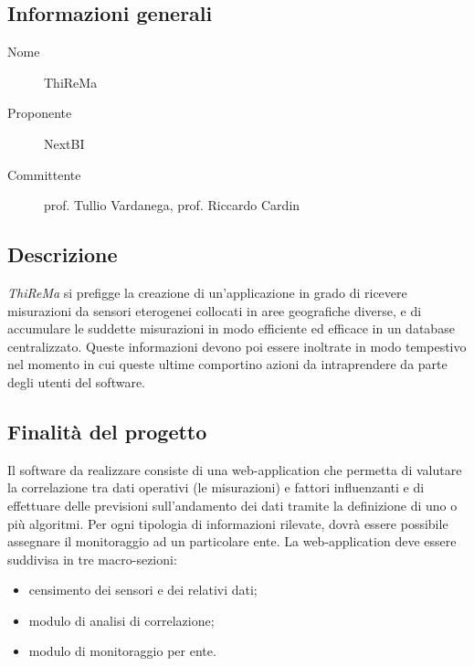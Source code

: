 \documentclass[../studio-di-fattibilita.tex]{subfiles}
\begin{document}
  \subsection{Informazioni generali}%
  \label{subsec:informazioni_generali}
  \begin{description}
    \item[Nome] ThiReMa
    \item[Proponente] NextBI
    \item[Committente] prof. Tullio Vardanega, prof. Riccardo Cardin
  \end{description}

  \subsection{Descrizione}%
  \label{subsec:descrizione}
  \textit{ThiReMa} si prefigge la creazione di un'applicazione in grado di ricevere misurazioni da sensori eterogenei collocati in aree geografiche diverse, e di accumulare le suddette misurazioni in modo efficiente ed efficace in un database centralizzato. Queste informazioni devono poi essere inoltrate in modo tempestivo nel momento in cui queste ultime comportino azioni da intraprendere da parte degli utenti del software.

  \subsection{Finalità del progetto}%
  \label{subsec:finalita_del_progetto}
  Il software da realizzare consiste di una web-application che permetta di valutare la correlazione tra dati operativi (le misurazioni) e fattori influenzanti e di effettuare delle previsioni sull'andamento dei dati tramite la definizione di uno o più algoritmi.
  Per ogni tipologia di informazioni rilevate, dovrà essere possibile assegnare il monitoraggio ad un particolare ente.
  La web-application deve essere suddivisa in tre macro-sezioni:
  \begin{itemize}
    \item censimento dei sensori e dei relativi dati;
    \item modulo di analisi di correlazione;
    \item modulo di monitoraggio per ente.
  \end{itemize}
\end{document}
